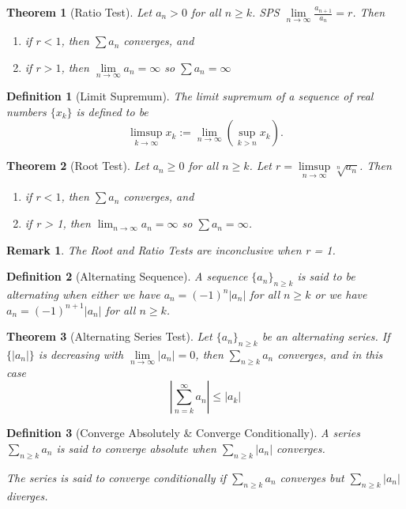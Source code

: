 \documentclass[11pt, oneside]{book}
\theoremstyle{break}
\newtheorem{thm}{Theorem}[section]
\newtheorem*{remark}{Remark}
\newtheorem{defn}{Definition}[section]
\begin{document}
\begin{thm}[Ratio Test]
	Let $a_n > 0$ for all $n \geq k$. SPS $\lim\limits_{n \to \infty} \frac{a_{n + 1}}{a_n} = r$. Then
	\begin{enumerate}
		\item if $r < 1$, then $\sum a_n$ converges, and
		\item if $r > 1$, then $\lim\limits_{n \to \infty} a_n = \infty$ so $\sum a_n = \infty$
	\end{enumerate}
\end{thm}

\begin{defn}[Limit Supremum]
	The limit supremum of a sequence of real numbers $\{x_k\}$ is defined to be
	\[
		\limsup_{k \to \infty} x_k := \lim_{n \to \infty} \left( \sup_{k > n} x_k \right).
	\]
\end{defn}

\begin{thm}[Root Test]
	Let $a_n \geq 0$ for all $n \geq k$. Let $r = \limsup\limits_{n \to \infty} \sqrt[n]{a_n}$. Then
	\begin{enumerate}
		\item if $r < 1$, then $\sum a_n$ converges, and
		\item if r > 1, then $\lim_{n \to \infty} a_n = \infty$ so $\sum a_n = \infty$.
	\end{enumerate}
\end{thm}

\begin{remark}
	The Root and Ratio Tests are inconclusive when r = 1.
\end{remark}

\begin{defn}[Alternating Sequence]
	A sequence $\{a_n\}_{n \geq k}$ is said to be alternating when either we have $a_n = (-1)^n|a_n|$ for all $n \geq k$ or we have $a_n = (-1)^{n + 1}|a_n|$ for all $n \geq k$.
\end{defn}

\begin{thm}[Alternating Series Test]
	Let $\{a_n\}_{n \geq k}$ be an alternating series. If $\{|a_n|\}$ is decreasing with $\lim\limits_{n \to \infty} |a_n| = 0$, then $\sum_{n \geq k} a_n$ converges, and in this case
	\[
		\left| \sum_{n=k}^{\infty} a_n \right| \leq |a_k|
	\]
\end{thm}

\begin{defn}[Converge Absolutely \& Converge Conditionally]
	A series $\sum_{n \geq k} a_n$ is said to converge absolute when $\sum_{n \geq k} |a_n|$ converges.

	The series is said to converge conditionally if $\sum_{n \geq k} a_n$ converges but $\sum_{n \geq k} |a_n|$ diverges.
\end{defn}
\end{document}
